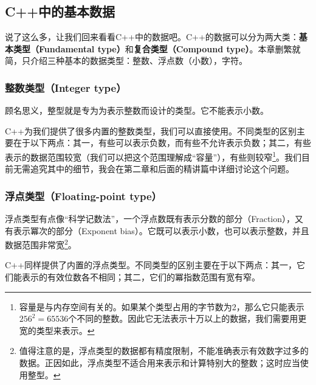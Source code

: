 \subsection*{C++中的基本数据}
说了这么多，让我们回来看看C++中的数据吧。C++的数据可以分为两大类：\textbf{基本类型（Fundamental type）}和\textbf{复合类型（Compound type）}。本章删繁就简，只介绍三种基本的数据类型：整数、浮点数（小数），字符。\par
\subsubsection*{整数类型（Integer type）}
顾名思义，整型就是专为为表示整数而设计的类型。它不能表示小数。\par
C++为我们提供了很多内置的整数类型，我们可以直接使用。不同类型的区别主要在于以下两点：其一，有些可以表示负数，而有些不允许表示负数；其二，有些表示的数据范围较宽（我们可以把这个范围理解成``容量''），有些则较窄\footnote{容量是与内存空间有关的。如果某个类型占用的字节数为2，那么它只能表示$256^2=65536$个不同的整数。因此它无法表示十万以上的数据，我们需要用更宽的类型来表示。}。我们目前无需追究其中的细节，我会在第二章和后面的精讲篇中详细讨论这个问题。\par
\subsubsection*{浮点类型（Floating-point type）}
浮点类型有点像``科学记数法''，一个浮点数既有表示分数的部分（Fraction），又有表示冪次的部分（Exponent bias）。它既可以表示小数，也可以表示整数，并且数据范围非常宽\footnote{值得注意的是，浮点类型的数据都有精度限制，不能准确表示有效数字过多的数据。正因如此，浮点类型不适合用来表示和计算特别大的整数；这时应当使用整型。}。\par
C++同样提供了内置的浮点类型。不同类型的区别主要在于以下两点：其一，它们能表示的有效位数各不相同；其二，它们的冪指数范围有宽有窄。\par
